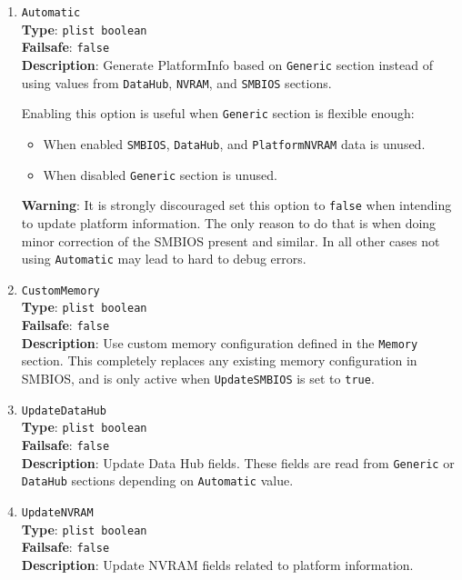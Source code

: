 \documentclass[]{article}
\providecommand{\tightlist}{%
  \setlength{\itemsep}{0pt}\setlength{\parskip}{0pt}}
\begin{document}
\begin{enumerate}
\item
  \texttt{Automatic}\\
  \textbf{Type}: \texttt{plist\ boolean}\\
  \textbf{Failsafe}: \texttt{false}\\
  \textbf{Description}: Generate PlatformInfo based on \texttt{Generic}
  section instead of using values from \texttt{DataHub}, \texttt{NVRAM},
  and \texttt{SMBIOS} sections.

  Enabling this option is useful when \texttt{Generic} section is flexible
  enough:
  \begin{itemize}
  \tightlist
  \item When enabled \texttt{SMBIOS}, \texttt{DataHub}, and
  \texttt{PlatformNVRAM} data is unused.
  \item When disabled \texttt{Generic} section is unused.
  \end{itemize}

  \textbf{Warning}: It is strongly discouraged set this option to \texttt{false}
  when intending to update platform information. The only reason to do that is
  when doing minor correction of the SMBIOS present and similar. In all other
  cases not using \texttt{Automatic} may lead to hard to debug errors.

\item
  \texttt{CustomMemory}\\
  \textbf{Type}: \texttt{plist\ boolean}\\
  \textbf{Failsafe}: \texttt{false}\\
  \textbf{Description}: Use custom memory configuration defined in the
  \texttt{Memory} section. This completely replaces any existing memory
  configuration in SMBIOS, and is only active when \texttt{UpdateSMBIOS}
  is set to \texttt{true}.

\item
  \texttt{UpdateDataHub}\\
  \textbf{Type}: \texttt{plist\ boolean}\\
  \textbf{Failsafe}: \texttt{false}\\
  \textbf{Description}: Update Data Hub fields. These fields are read
  from \texttt{Generic} or \texttt{DataHub} sections depending on
  \texttt{Automatic} value.
\item
  \texttt{UpdateNVRAM}\\
  \textbf{Type}: \texttt{plist\ boolean}\\
  \textbf{Failsafe}: \texttt{false}\\
  \textbf{Description}: Update NVRAM fields related to platform information.


\end{enumerate}
\end{document}
